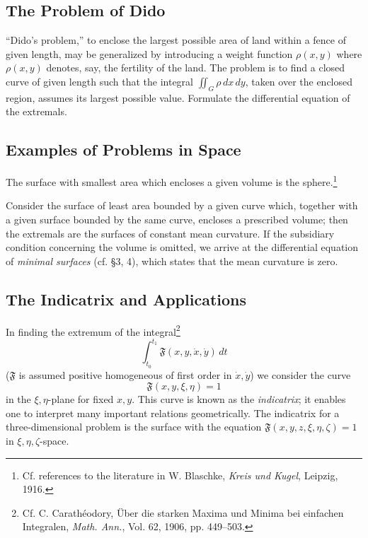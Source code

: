 \subsection{The Problem of Dido}
``Dido's problem,'' to enclose the largest possible area of land within a fence of given length, may be generalized by introducing a weight function $\rho(x,y)$ where $\rho(x,y)$ denotes, say, the fertility of the land. The problem is to find a closed curve of given length such that the integral $\iint_G\rho\,dx\,dy$, taken over the enclosed region, assumes its largest possible value. Formulate the differential equation of the extremals.

\subsection{Examples of Problems in Space}
The surface with smallest area which encloses a given volume is the sphere.\footnote{Cf. references to the literature in W. Blaschke, \emph{Kreis und Kugel}, Leipzig, 1916.}

Consider the surface of least area bounded by a given curve which, together with a given surface bounded by the same curve, encloses a prescribed volume; then the extremals are the surfaces of constant mean curvature. If the subsidiary condition concerning the volume is omitted, we arrive at the differential equation of \emph{minimal surfaces} (cf. \S3, 4), which states that the mean curvature is zero.

\subsection{The Indicatrix and Applications}
In finding the extremum of the integral\footnote{Cf. C. Carath\'eodory, \"Uber die starken Maxima und Minima bei einfachen Integralen, \emph{Math. Ann.}, Vol. 62, 1906, pp. 449--503.}
\[
\int_{t_0}^{t_1}\mathfrak F(x,y,\dot x,\dot y)\,dt
\]
($\mathfrak F$ is assumed positive homogeneous of first order in $\dot x,\dot y$) we consider the curve
\[
\mathfrak F(x,y,\xi,\eta)=1
\]
in the $\xi,\eta$-plane for fixed $x,y$. This curve is known as the \emph{indicatrix}; it enables one to interpret many important relations geometrically. The indicatrix for a three-dimensional problem is the surface with the equation $\mathfrak F(x,y,z,\xi,\eta,\zeta)=1$ in $\xi,\eta,\zeta$-space.

